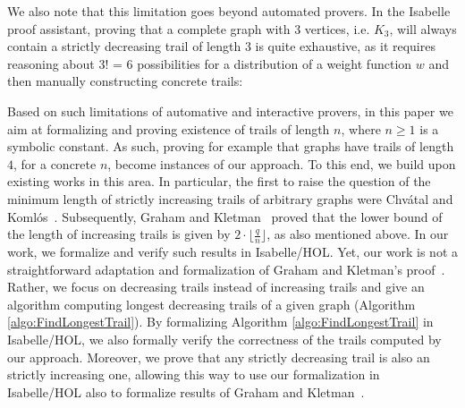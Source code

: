 \begin{isabellebody}
\begin{isamarkuptext}
We also note that this limitation goes beyond automated provers. In the Isabelle proof assistant, 
proving that a complete graph with 3 vertices, i.e. $K_3$,  will
always contain a strictly decreasing trail of length 3 is quite exhaustive, as it requires reasoning about 3! = 6 possibilities
for a distribution of a weight function $w$ and then manually constructing concrete trails:

\begin{center}

\end{center}

Based on such limitations of automative and interactive provers, in this paper we aim at formalizing 
and proving existence of trails of length $n$, where $n\geq 1$ is a symbolic constant. As such, 
proving for example that graphs have trails of length $4$, for a concrete $n$,  become instances 
of our approach. To this end, we build upon existing works in this area. In particular, the first 
to raise the question of the minimum length of strictly increasing
trails of arbitrary graphs  were Chv\'atal and Koml\'os~\cite{chvatal1970some}. Subsequently, 
Graham and Kletman~\cite{graham1973increasing} proved that the lower bound of the length of increasing trails 
is given by $2 \cdot \lfloor\frac{q}{n}\rfloor$, as also mentioned above. In our work, we formalize and verify 
such results in Isabelle/HOL. Yet, our work is not a straightforward adaptation and formalization   
of Graham and Kletman's proof~\cite{graham1973increasing}. Rather, we focus on decreasing trails instead of increasing trails 
and give an algorithm computing longest decreasing trails of a given graph (Algorithm \ref{algo:FindLongestTrail}).  
By formalizing Algorithm \ref{algo:FindLongestTrail} in Isabelle/HOL, we also formally verify the correctness 
of the trails computed by our approach. Moreover, we prove that any strictly decreasing trail is also an strictly increasing 
one, allowing this way to use our formalization in Isabelle/HOL also to formalize results of Graham and Kletman~\cite{graham1973increasing}.


\end{isamarkuptext}
\end{isabellebody}
